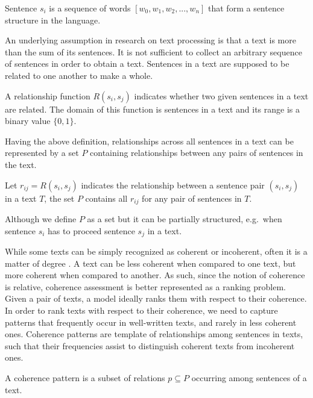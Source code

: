\begin{definition}
Sentence $s_i$ is a sequence of words $[w_0, w_1, w_2, ... , w_n]$ that form a sentence structure in the language. 
\end{definition}

An underlying assumption in research on text processing is that a text is more than the sum of its sentences. 
It is not sufficient to collect an arbitrary sequence of sentences in order to obtain a text. 
Sentences in a text are supposed to be related to one another to make a whole. 

\begin{definition}
A relationship function $R(s_i,s_j)$ indicates whether two given sentences in a text are related. 
The domain of this function is sentences in a text and its range is a binary value $
\lbrace 0,1\rbrace$. 
\end{definition} 

Having the above definition, relationships across all sentences in a text can be represented by a set $P$ containing relationships between any pairs of sentences in the text. 

\begin{definition}
Let $r_{ij}= R(s_i,s_j)$ indicates the relationship between a sentence pair $(s_i,s_j)$ in a text $T$, the set $P$ contains all $r_{ij}$ for any pair of sentences in $T$.
\end{definition}  

Although we define $P$ as a set but it can be partially structured, e.g.\ when sentence $s_i$ has to proceed sentence $s_j$ in a text. 


While some texts can be simply recognized as coherent or incoherent, often it is a matter of degree \cite{halliday76}. 
A text can be less coherent when compared to one text, but more coherent when compared to another. 
As such, since the notion of coherence is relative, coherence assessment is better represented as a ranking problem. 
Given a pair of texts, a model ideally ranks them with respect to their coherence.
In order to rank texts with respect to their coherence, we need to capture patterns that frequently occur in well-written texts, and rarely in less coherent ones.  
Coherence patterns are template of relationships among sentences in texts, such that their frequencies assist to distinguish coherent texts from incoherent ones. 

\begin{definition}
A coherence pattern is a subset of relations $p \subseteq P$ occurring among sentences of a text.   
\end{definition}

